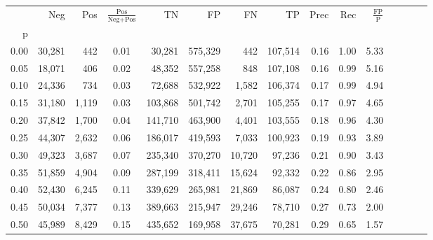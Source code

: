 \begin{tabular}{rrrcrrrrrrrrrrr}
\toprule
{} &     Neg &    Pos & $\frac{\text{Pos}}{\text{Neg}+\text{Pos}}$ &       TN &       FP &       FN &       TP &  Prec &   Rec & $\frac{\text{FP}}{\text{P}}$ \\
p    &         &        &                                            &          &          &          &          &       &       &                              \\
\midrule
0.00 &  30,281 &    442 &                                       0.01 &   30,281 &  575,329 &      442 &  107,514 &  0.16 &  1.00 &                         5.33 \\
0.05 &  18,071 &    406 &                                       0.02 &   48,352 &  557,258 &      848 &  107,108 &  0.16 &  0.99 &                         5.16 \\
0.10 &  24,336 &    734 &                                       0.03 &   72,688 &  532,922 &    1,582 &  106,374 &  0.17 &  0.99 &                         4.94 \\
0.15 &  31,180 &  1,119 &                                       0.03 &  103,868 &  501,742 &    2,701 &  105,255 &  0.17 &  0.97 &                         4.65 \\
0.20 &  37,842 &  1,700 &                                       0.04 &  141,710 &  463,900 &    4,401 &  103,555 &  0.18 &  0.96 &                         4.30 \\
0.25 &  44,307 &  2,632 &                                       0.06 &  186,017 &  419,593 &    7,033 &  100,923 &  0.19 &  0.93 &                         3.89 \\
0.30 &  49,323 &  3,687 &                                       0.07 &  235,340 &  370,270 &   10,720 &   97,236 &  0.21 &  0.90 &                         3.43 \\
0.35 &  51,859 &  4,904 &                                       0.09 &  287,199 &  318,411 &   15,624 &   92,332 &  0.22 &  0.86 &                         2.95 \\
0.40 &  52,430 &  6,245 &                                       0.11 &  339,629 &  265,981 &   21,869 &   86,087 &  0.24 &  0.80 &                         2.46 \\
0.45 &  50,034 &  7,377 &                                       0.13 &  389,663 &  215,947 &   29,246 &   78,710 &  0.27 &  0.73 &                         2.00 \\
0.50 &  45,989 &  8,429 &                                       0.15 &  435,652 &  169,958 &   37,675 &   70,281 &  0.29 &  0.65 &                         1.57 \\

\end{tabular}
